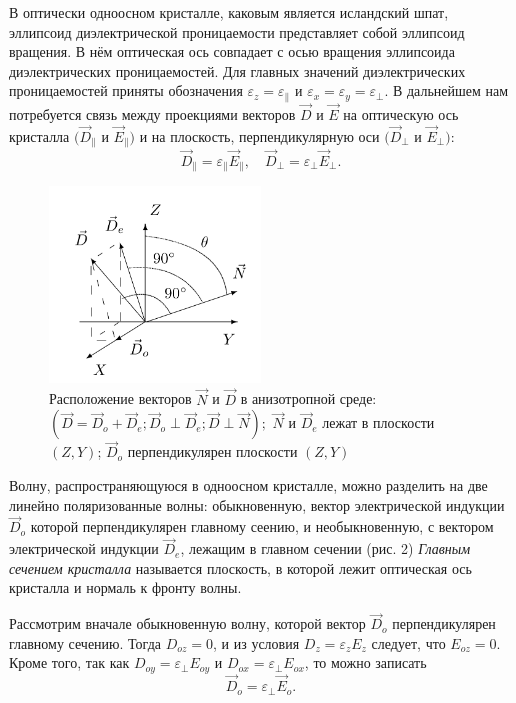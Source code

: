 \documentclass[a4paper, 12pt]{article}%
\begin{document}
В оптически одноосном кристалле, каковым является исландский шпат, эллипсоид диэлектрической проницаемости представляет собой эллипсоид вращения.
В нём оптическая ось совпадает с осью вращения эллипсоида диэлектрических проницаемостей. Для главных значений диэлектрических проницаемостей приняты обозначения $\varepsilon_z = \varepsilon_\parallel$ и $\varepsilon_x = \varepsilon_y = \varepsilon_\perp$. В дальнейшем нам потребуется связь между проекциями векторов $\vec D$ и $\vec E$ на оптическую ось кристалла $(\vec D_\parallel $ и $\vec E_\parallel )$ и на плоскость, перпендикулярную оси $(\vec D_\perp $ и $\vec E_\perp )$:
\begin{equation}
	\vec D_\parallel  = \varepsilon_\parallel \vec E_\parallel , \quad \vec D_\perp  = \varepsilon_\perp \vec E_\perp. 
\end{equation}

\begin{figure}
    \centering
    \includegraphics[width=0.5\textwidth]{images/DN.png}
    \caption{Расположение векторов $\vec N$ и $\vec D$ в анизотропной среде: $(\vec D = \vec D_o + \vec D_e; \vec D_o \perp \vec D_e; \vec D \perp \vec N);$ $\vec N$ и $\vec D_e$ лежат в плоскости $(Z, Y)$; $\vec D_o$ перпендикулярен плоскости $(Z, Y)$}
\end{figure} 
Волну, распространяющуюся в одноосном кристалле, можно разделить на две линейно поляризованные волны: обыкновенную, вектор электрической индукции $\vec D_o$ которой перпендикулярен главному сеению, и необыкновенную, с вектором электрической индукции $\vec D_e$, лежащим в главном сечении (рис. 2) \textit{Главным сечением кристалла} называется плоскость, в которой лежит оптическая ось кристалла и нормаль к фронту волны.

Рассмотрим вначале обыкновенную волну, которой вектор $\vec D_o$ перпендикулярен главному сечению. Тогда $D_{oz} = 0$, и из условия $D_z = \varepsilon_z E_z$ следует, что $E_{oz} = 0.$ Кроме того, так как $D_{oy} = \varepsilon_\perp E_{oy}$ и $D_{ox} = \varepsilon_\perp E_{ox}$, то можно записать 
\begin{equation}
	\vec D_o = \varepsilon_\perp \vec E_o.
\end{equation}
\end{document}
